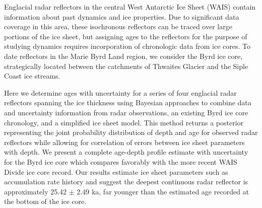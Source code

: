 Englacial radar reflectors in the central West Antarctic Ice Sheet (WAIS) contain information about past dynamics and ice properties. Due to significant data coverage in this area, these isochronous reflectors can be traced over large portions of the ice sheet, but assigning ages to the reflectors for the purpose of studying dynamics requires incorporation of chronologic data from ice cores. To date reflectors in the Marie Byrd Land region, we consider the Byrd ice core, strategically located between the catchments of Thwaites Glacier and the Siple Coast ice streams. 

Here we determine ages with uncertainty for a series of four englacial radar reflectors spanning the ice thickness using Bayesian approaches to combine data and uncertainty information from radar observations, an existing Byrd ice core chronology, and a simplified ice sheet model. This method returns a posterior representing the joint probability distribution of depth and age for observed radar reflectors while allowing for correlation of errors between ice sheet parameters with depth. We present a complete age-depth profile estimate with uncertainty for the Byrd ice core which compares favorably with the more recent WAIS Divide ice core record. Our results estimate ice sheet parameters such as accumulation rate history and suggest the deepest continuous radar reflector is approximately 25.42 $\pm$ 2.49 ka, far younger than the estimated age recorded at the bottom of the ice core. 